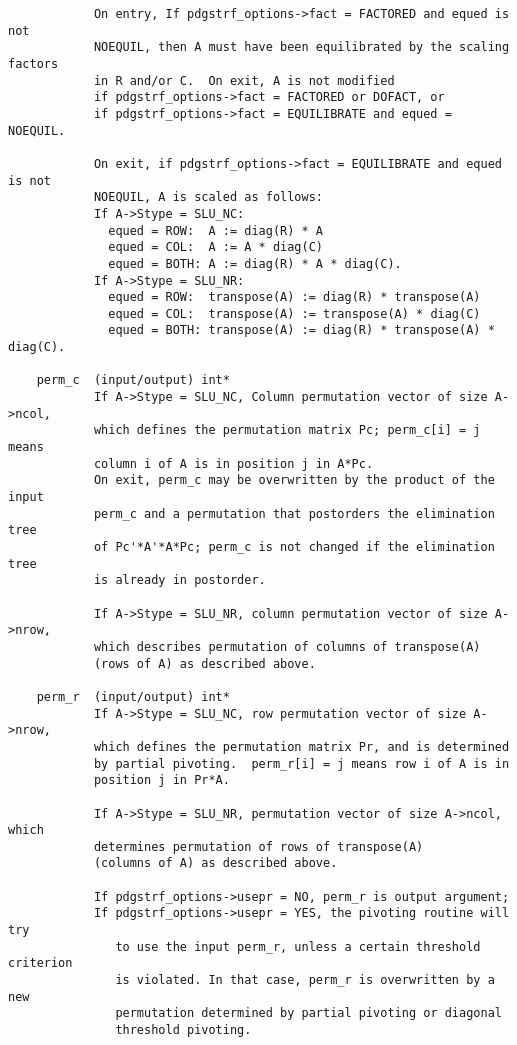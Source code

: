 \begin{verbatim}
            On entry, If pdgstrf_options->fact = FACTORED and equed is not 
            NOEQUIL, then A must have been equilibrated by the scaling factors
            in R and/or C.  On exit, A is not modified 
            if pdgstrf_options->fact = FACTORED or DOFACT, or 
            if pdgstrf_options->fact = EQUILIBRATE and equed = NOEQUIL.

            On exit, if pdgstrf_options->fact = EQUILIBRATE and equed is not
            NOEQUIL, A is scaled as follows:
            If A->Stype = SLU_NC:
              equed = ROW:  A := diag(R) * A
              equed = COL:  A := A * diag(C)
              equed = BOTH: A := diag(R) * A * diag(C).
            If A->Stype = SLU_NR:
              equed = ROW:  transpose(A) := diag(R) * transpose(A)
              equed = COL:  transpose(A) := transpose(A) * diag(C)
              equed = BOTH: transpose(A) := diag(R) * transpose(A) * diag(C).

    perm_c  (input/output) int*
            If A->Stype = SLU_NC, Column permutation vector of size A->ncol,
            which defines the permutation matrix Pc; perm_c[i] = j means
            column i of A is in position j in A*Pc.
            On exit, perm_c may be overwritten by the product of the input
            perm_c and a permutation that postorders the elimination tree
            of Pc'*A'*A*Pc; perm_c is not changed if the elimination tree
            is already in postorder.

            If A->Stype = SLU_NR, column permutation vector of size A->nrow,
            which describes permutation of columns of transpose(A) 
            (rows of A) as described above.
    
    perm_r  (input/output) int*
            If A->Stype = SLU_NC, row permutation vector of size A->nrow, 
            which defines the permutation matrix Pr, and is determined
            by partial pivoting.  perm_r[i] = j means row i of A is in 
            position j in Pr*A.

            If A->Stype = SLU_NR, permutation vector of size A->ncol, which
            determines permutation of rows of transpose(A)
            (columns of A) as described above.

            If pdgstrf_options->usepr = NO, perm_r is output argument;
            If pdgstrf_options->usepr = YES, the pivoting routine will try 
               to use the input perm_r, unless a certain threshold criterion
               is violated. In that case, perm_r is overwritten by a new
               permutation determined by partial pivoting or diagonal 
               threshold pivoting.


\end{verbatim}
